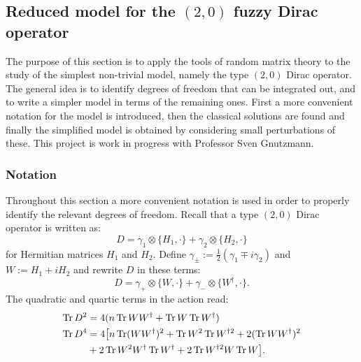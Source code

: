 \subsection{Reduced model for the $(2,0)$ fuzzy Dirac operator}\label{sven}
The purpose of this section is to apply the tools of random matrix theory to the study of the simplest non-trivial model, namely the type $(2,0)$ Dirac operator. The general idea is to identify degrees of freedom that can be integrated out, and to write a simpler model in terms of the remaining ones.\newline
First a more convenient notation for the model is introduced, then the classical solutions are found and finally the simplified model is obtained by considering small perturbations of these.\newline
This project is work in progress with Professor Sven Gnutzmann.

\subsubsection{Notation}
Throughout this section a more convenient notation is used in order to properly identify the relevant degrees of freedom.\newline
Recall that a type $(2,0)$ Dirac operator is written as:
\begin{equation}
D = \gamma_1 \otimes \{H_1, \cdot \} + \gamma_2 \otimes \{H_2, \cdot \}
\end{equation}
for Hermitian matrices $H_1$ and $H_2$. Define $\gamma_{\pm} := \frac{1}{2}(\gamma_1 \mp i \gamma_2)$ and $W := H_1 + i H_2$ and rewrite $D$ in these terms:
\begin{equation}
D = \gamma_+ \otimes \{ W, \cdot \} + \gamma_- \otimes \{ W^\dagger, \cdot \}.
\end{equation}
The quadratic and quartic terms in the action read:
\begin{align}
\operatorname{Tr} D^2 &= 4 (n \operatorname{Tr} W W^{\dagger} + \operatorname{Tr} W \operatorname{Tr} W^{\dagger}) \\ 
\operatorname{Tr} D^4 &= 4 \big[ n \operatorname{Tr}(W W^\dagger)^2 + \operatorname{Tr} W^2 \operatorname{Tr} W^{\dagger 2} + 2 (\operatorname{Tr} W W^\dagger)^2 \notag \\ 
&+ 2 \operatorname{Tr} W^2 W^\dagger \operatorname{Tr} W^\dagger + 2 \operatorname{Tr} W^{\dagger 2} W \operatorname{Tr} W \big].
\end{align}


